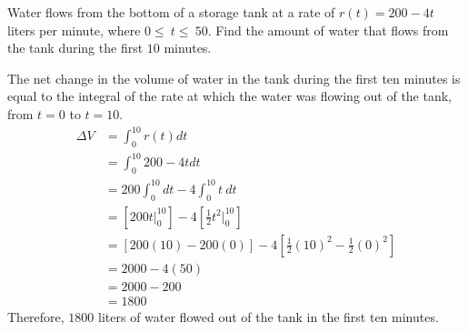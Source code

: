 \begin{exercise}
	Water flows from the bottom of a storage tank at a rate of $r\left(t\right)=200-4t$ liters per minute, where $0\leq~t\leq~50$. Find the amount of water that flows from the tank during the first $10$ minutes.
\end{exercise}
\begin{solution}
	The net change in the volume of water in the tank during the first ten minutes is equal to the integral of the rate at which the water was flowing out of the tank, from $t=0$ to $t=10$.
	\begin{align*}
	\Delta V&=\int_{0}^{10} r\left(t\right)dt\\
	&=\int_{0}^{10} 200-4t dt\\
	&=200\int_{0}^{10}dt -4\int_{0}^{10} t\: dt\\
	&=\left[200t\big|_0^{10}\right] -4\left[\frac{1}{2}t^2\big|_{0}^{10}\right] \\
	&=\left[200\left(10\right) - 200\left(0\right)\right]-4\left[\frac{1}{2}\left(10\right)^2 - \frac{1}{2}\left(0\right)^2\right]\\
	&=2000-4\left(50\right)\\
	&=2000-200\\
	&=1800
	\end{align*}
	Therefore, $1800$ liters of water flowed out of the tank in the first ten minutes.
\end{solution}
